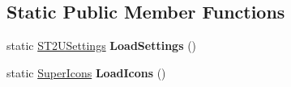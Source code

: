 \subsection*{Static Public Member Functions}
\begin{DoxyCompactItemize}
\item 
\mbox{\label{class_super_tiled2_unity_1_1_editor_1_1_s_t2_u_settings_a56ed42837657e0246984c47cd8df86b0}} 
static \mbox{\hyperlink{class_super_tiled2_unity_1_1_editor_1_1_s_t2_u_settings}{S\+T2\+U\+Settings}} {\bfseries Load\+Settings} ()
\item 
\mbox{\label{class_super_tiled2_unity_1_1_editor_1_1_s_t2_u_settings_afcf026bb5ebc164677be64226141771d}} 
static \mbox{\hyperlink{class_super_tiled2_unity_1_1_editor_1_1_super_icons}{Super\+Icons}} {\bfseries Load\+Icons} ()
\end{DoxyCompactItemize}
